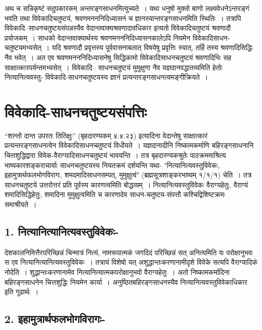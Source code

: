 {अथ च सन्निकृष्टं सदुपकारकम् अन्तरङ्गसाधनमित्युच्यते~। यथा धनुषो मुक्तो बाणो लक्ष्यवेधनेऽन्तरङ्गं भवति तथा विवेकादिचतुष्टयं, श्रवणमनननिदिध्यासनं च ज्ञानस्यान्तरङ्गसाधनमिति स्थितिः~। तत्रापि विवेकादि–साधनचतुष्टयसंपन्नस्यैव वेदान्तवाक्यश्रवणादावधिकार इत्यतो विवेकादिचतुष्टयं श्रवणादौ प्रयोजकम्~। साधको वेदान्तवाक्यार्थस्य श्रवणमनननिदिध्यासनकालेऽपि नियमेन विवेकादिसाधन- चतुष्टयमभ्यसेत्~। यदि श्रवणादौ प्रवृत्तस्य पूर्ववासनाबलात् विषयेषु प्रवृत्तिः स्यात्, तर्हि तस्य श्रवणादिसिद्धिः नैव भवेत्~। अत एव श्रवणमनननिदिध्यासनेषु सिद्धिकामो विवेकादिसाधनचतुष्टयं श्रवणादिभिः सह साक्षात्कारपर्यन्तमभ्यसेत्~। विवेकादि– साधनचतुष्टयं मुमुक्षुणा नैव यज्ञदानवद्धातव्यमिति हेतोः नित्यानित्यवस्तु- विवेकादि-साधनचतुष्टयस्य ज्ञानं प्रत्यन्तरङ्गसाधनत्वमङ्गीक्रियते~। 

\section*{विवेकादि-साधनचतुष्टयसंपत्तिः}

“शान्तो दान्त उपरतः तितिक्षुः” (बृहदारण्यकम् ४.४.२३) इत्यादिना वेदान्तेषु साक्षात्कारं प्रत्यन्तरङ्गसाधनत्वेन विवेकादिसाधनचतुष्टयं विधीयते~। यज्ञदानादीनि निष्कामकर्माणि बहिरङ्गसाधनानि चित्तशुद्धिद्वारा विवेक-वैराग्यादिसाधनचतुष्टयं भावयन्ति~। तत्र बृहदारण्यकश्रुतेः पाठक्रममाश्रित्य भाष्यकारशङ्कराचार्याः साधनचतुष्टयस्य नियतक्रमं दर्शयन्ति यथा- "नित्यानित्यवस्तुविवेकः, इहामुत्रार्थफलभोगविरागः, शमदमादिसाधनसम्पत्, मुमुक्षुत्वं" (ब्रह्मसूत्रशाङ्करभाष्यम् १/१/१) चेति~। तत्र साधनचतुष्टये उत्तरोत्तरं प्रति पूर्वस्य कारणत्वमिति बोद्धव्यम्~। नित्यानित्यवस्तुविवेकः वैराग्यहेतुः, वैराग्यं शमादिसिद्धिहेतुः, शमादिना मुमुक्षुत्वमिति च कारणादेव साधन-चतुष्टय-संपत्तौ कश्चिद्विशिष्टक्रमः समाश्रीयते~। 

\subsection*{1. नित्यानित्यानित्यवस्तुविवेकः-}

देशकालनिमित्तैरपरिच्छिन्नं चिन्मात्रं नित्यं, नामरूपात्मकं जगदिदं परिच्छिन्नं सत् अनित्यमिति यः परोक्षानुभवः स एव नित्यानित्यानित्यवस्तुविवेकः~। तत्रायं विशेषो यत् अशुद्धान्तःकरणानामीदृशे विवेके सत्यपि वैराग्यादिकं नोदेति~। शुद्धान्तःकरणानामेव नित्यानित्यात्मकपरोक्षानुभवो वैराग्यहेतुः~। अतो निष्कामकर्मादिना बहिरङ्गसाधनेन चित्तशुद्धिः नियमेन कार्या~। अनुष्ठितबहिरङ्गसाधनस्यैव नित्यानित्यवस्तुविवेकाधिकार इति गूढार्थः~। 

\subsection*{2. इहामुत्रार्थफलभोगविरागः-}

}
